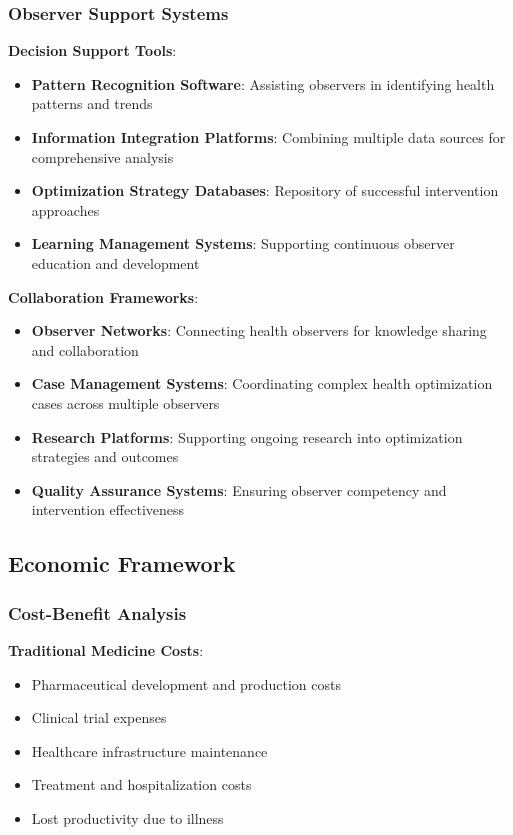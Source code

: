 \documentclass[12pt,a4paper]{article}
\begin{document}
\subsubsection{Observer Support Systems}

\textbf{Decision Support Tools}:
\begin{itemize}
\item \textbf{Pattern Recognition Software}: Assisting observers in identifying health patterns and trends
\item \textbf{Information Integration Platforms}: Combining multiple data sources for comprehensive analysis
\item \textbf{Optimization Strategy Databases}: Repository of successful intervention approaches
\item \textbf{Learning Management Systems}: Supporting continuous observer education and development
\end{itemize}

\textbf{Collaboration Frameworks}:
\begin{itemize}
\item \textbf{Observer Networks}: Connecting health observers for knowledge sharing and collaboration
\item \textbf{Case Management Systems}: Coordinating complex health optimization cases across multiple observers
\item \textbf{Research Platforms}: Supporting ongoing research into optimization strategies and outcomes
\item \textbf{Quality Assurance Systems}: Ensuring observer competency and intervention effectiveness
\end{itemize}

\subsection{Economic Framework}

\subsubsection{Cost-Benefit Analysis}

\textbf{Traditional Medicine Costs}:
\begin{itemize}
\item Pharmaceutical development and production costs
\item Clinical trial expenses
\item Healthcare infrastructure maintenance
\item Treatment and hospitalization costs
\item Lost productivity due to illness
\end{itemize}
\end{document}
